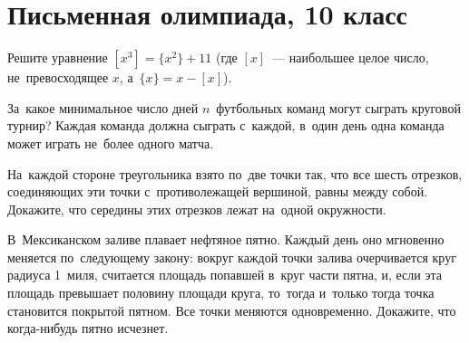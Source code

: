 

\section*{Письменная олимпиада, 10 класс}


\begin{problems}

\item
Решите уравнение $[x^3] = \{x^2\} + 11$
(где $[x]$~--- наибольшее целое число, не~превосходящее $x$,
а~$\{x\} = x - [x]$).

\item
За~какое минимальное число дней $n$~футбольных команд могут сыграть круговой
турнир?
Каждая команда должна сыграть с~каждой, в~один день одна команда может играть
не~более одного матча.

\item
На~каждой стороне треугольника взято по~две точки так, что все шесть отрезков,
соединяющих эти точки с~противолежащей вершиной, равны между собой.
Докажите, что середины этих отрезков лежат на~одной окружности. 

\item
В~Мексиканском заливе плавает нефтяное пятно.
Каждый день оно мгновенно меняется по~следующему закону: вокруг каждой точки
залива очерчивается круг радиуса 1~миля, считается площадь попавшей в~круг
части пятна, и, если эта площадь превышает половину площади круга,
то~тогда и~только тогда точка становится покрытой пятном.
Все точки меняются одновременно.
Докажите, что когда-нибудь пятно исчезнет.

\end{problems}

